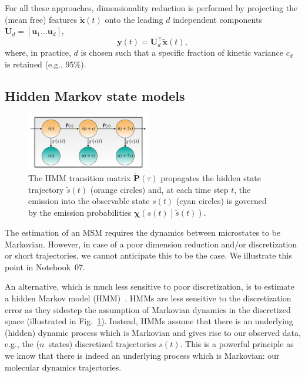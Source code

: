 \documentclass[9pt,tutorial]{livecoms}
\begin{document}
For all these approaches,
dimensionality reduction is performed by projecting the (mean free) features $\tilde{\mathbf{x}}(t)$
onto the leading $d$ independent components $\mathbf{U}_d=\left[\mathbf{u}_1 \dots \mathbf{u}_d\right]$,
\begin{equation}
\mathbf{y}(t) = \mathbf{U}_d^\top \tilde{\mathbf{x}}(t),
\end{equation}
where, in practice, $d$ is chosen such that a specific fraction of kinetic variance $c_d$ is retained (e.g., $95\%$).

\subsection{Hidden Markov state models}

\begin{figure}
\includegraphics[width=0.48\textwidth]{figure_1}
\caption{The HMM transition matrix $\tilde{\mathbf{P}}(\tau)$ propagates the hidden state trajectory $\tilde{s}(t)$ (orange circles) and, at each time step $t$, the emission into the observable state $s(t)$ (cyan circles) is governed by the emission probabilities $\bm{\chi}\left( s(t) \middle| \tilde{s}(t) \right)$.}
\label{fig:hmm-scheme}
\end{figure}

The estimation of an MSM requires the dynamics between microstates to be Markovian.
However, in case of a poor dimension reduction and/or discretization or short trajectories,
we cannot anticipate this to be the case.
We illustrate this point in Notebook~07.

An alternative, which is much less sensitive to poor discretization,
is to estimate a hidden Markov model (HMM)~\cite{hmm-baum-welch-alg,hmm-tutorial,jhp-spectral-rate-theory,noe-proj-hid-msm,bhmm-preprint}.
HMMs are less sensitive to the discretization error as they sidestep the assumption of Markovian dynamics in the discretized space (illustrated in Fig.~\ref{fig:hmm-scheme}).
Instead, HMMs assume that there is an underlying (hidden) dynamic process which is Markovian
and gives rise to our observed data, e.g., the ($n$~states) discretized trajectories $s(t)$.
This is a powerful principle as we know that there is indeed an underlying process which is Markovian:
our molecular dynamics trajectories.
\end{document}
